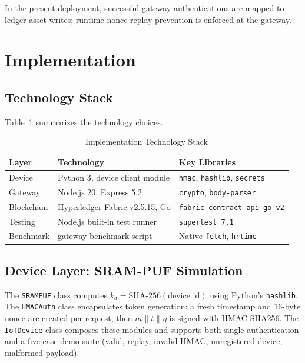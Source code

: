 \documentclass[conference]{IEEEtran}
\begin{document}
In the present deployment, successful gateway authentications are mapped to ledger asset writes; runtime nonce replay prevention is enforced at the gateway.

\section{Implementation}
\label{sec:impl}

\subsection{Technology Stack}

Table~\ref{tab:stack} summarizes the technology choices.

\begin{table}[htbp]
\caption{Implementation Technology Stack}
\label{tab:stack}
\centering
\begin{tabular}{p{1.5cm}p{3.1cm}p{2.8cm}}
\toprule
\textbf{Layer} & \textbf{Technology} & \textbf{Key Libraries} \\
\midrule
Device     & Python 3, device client module     & \texttt{hmac}, \texttt{hashlib}, \texttt{secrets} \\
Gateway    & Node.js 20, Express 5.2            & \texttt{crypto}, \texttt{body-parser} \\
Blockchain & Hyperledger Fabric v2.5.15, Go     & \texttt{fabric-contract-api-go v2} \\
Testing    & Node.js built-in test runner        & \texttt{supertest 7.1} \\
Benchmark  & gateway benchmark script            & Native \texttt{fetch}, \texttt{hrtime} \\
\bottomrule
\end{tabular}
\end{table}

\subsection{Device Layer: SRAM-PUF Simulation}

The \texttt{SRAMPUF} class computes $k_d=\text{SHA-256}(\text{device\_id})$ using Python's \texttt{hashlib}. The \texttt{HMACAuth} class encapsulates token generation: a fresh timestamp and 16-byte nonce are created per request, then $m\|t\|\eta$ is signed with HMAC-SHA256. The \texttt{IoTDevice} class composes these modules and supports both single authentication and a five-case demo suite (valid, replay, invalid HMAC, unregistered device, malformed payload).
\end{document}
